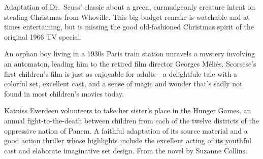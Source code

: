    Adaptation of Dr.\ Seuss' classic about a green, curmudgeonly creature intent on stealing Christmas from Whoville. This big-budget remake is watchable and at times entertaining, but is missing the good old-fashioned Christmas spirit of the original 1966 TV special. \author{DW} 

   An orphan boy living in a 1930s Paris train station unravels a mystery involving an automaton, leading him to the retired film director Georges M\'eli\`es. Scorsese's first children's film is just as enjoyable for adults---a delightfule tale with a colorful set, excellent cast, and a sense of magic and wonder that's sadly not found in most children's movies today. \author{DW} 

   Katniss Everdeen volunteers to take her sister's place in the Hunger Games, an annual fight-to-the-death between children from each of the twelve districts of the oppressive nation of Panem. A faithful adaptation of its source material and a good action thriller whose highlights include the excellent acting of its youthful cast and elaborate imaginative set design. From the novel by Suzanne Collins. \author{DW} 
